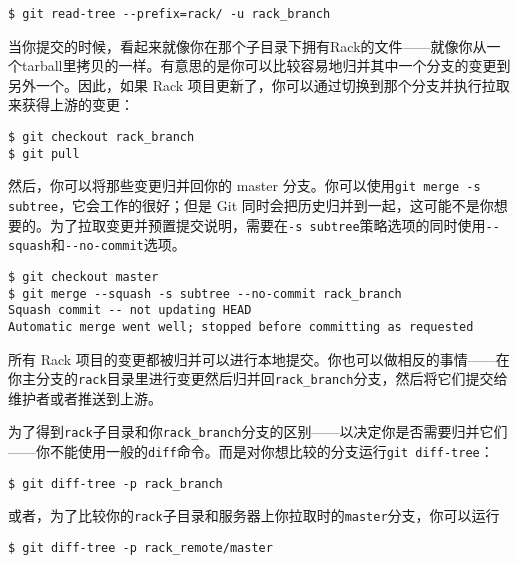 \documentclass[a4paper]{book}
\begin{document}
\begin{shaded}\begin{verbatim}
$ git read-tree --prefix=rack/ -u rack_branch
\end{verbatim}\end{shaded}

当你提交的时候，看起来就像你在那个子目录下拥有Rack的文件------就像你从一个tarball里拷贝的一样。有意思的是你可以比较容易地归并其中一个分支的变更到另外一个。因此，如果 Rack 项目更新了，你可以通过切换到那个分支并执行拉取来获得上游的变更：

\begin{shaded}\begin{verbatim}
$ git checkout rack_branch
$ git pull
\end{verbatim}\end{shaded}

然后，你可以将那些变更归并回你的 master 分支。你可以使用\texttt{git merge -s subtree}，它会工作的很好；但是 Git 同时会把历史归并到一起，这可能不是你想要的。为了拉取变更并预置提交说明，需要在\texttt{-s subtree}策略选项的同时使用\texttt{-{}-squash}和\texttt{-{}-no-commit}选项。

\begin{shaded}\begin{verbatim}
$ git checkout master
$ git merge --squash -s subtree --no-commit rack_branch
Squash commit -- not updating HEAD
Automatic merge went well; stopped before committing as requested
\end{verbatim}\end{shaded}

所有 Rack 项目的变更都被归并可以进行本地提交。你也可以做相反的事情------在你主分支的\texttt{rack}目录里进行变更然后归并回\texttt{rack\_branch}分支，然后将它们提交给维护者或者推送到上游。

为了得到\texttt{rack}子目录和你\texttt{rack\_branch}分支的区别------以决定你是否需要归并它们------你不能使用一般的\texttt{diff}命令。而是对你想比较的分支运行\texttt{git diff-tree}：

\begin{shaded}\begin{verbatim}
$ git diff-tree -p rack_branch
\end{verbatim}\end{shaded}

或者，为了比较你的\texttt{rack}子目录和服务器上你拉取时的\texttt{master}分支，你可以运行

\begin{shaded}\begin{verbatim}
$ git diff-tree -p rack_remote/master
\end{verbatim}\end{shaded}
\end{document}
